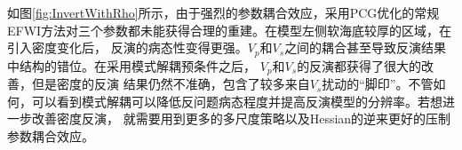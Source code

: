 如图\ref{fig:InvertWithRho}所示，由于强烈的参数耦合效应，采用PCG优化的常规EFWI方法对三个参数都未能获得合理的重建。在模型左侧软海底较厚的区域，在引入密度变化后，
反演的病态性变得更强。$V_p$和$V_s$之间的耦合甚至导致反演结果中结构的错位。在采用模式解耦预条件之后， $V_p$和$V_s$的反演都获得了很大的改善，但是密度的反演
结果仍然不准确，包含了较多来自$V_s$扰动的“脚印”。不管如何，可以看到模式解耦可以降低反问题病态程度并提高反演模型的分辨率。若想进一步改善密度反演，
就需要用到更多的多尺度策略以及Hessian的逆来更好的压制参数耦合效应。
\begin{figure}
    \begin{center}
        \\
        \\

\end{center}
\end{figure}
